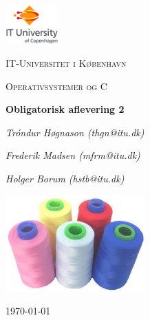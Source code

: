
\begin{titlepage}
	\centering
	\includegraphics[width=0.15\textwidth]{logo}\par\vspace{1cm}
	{\scshape\LARGE IT-Universitet i København \par}
	\vspace{1cm}
	{\scshape\Large Operativsystemer og C\par}
	\vspace{1.5cm}
	{\huge\bfseries Obligatorisk aflevering 2\par}
	\vspace{2cm}
	{\Large\itshape Tróndur Høgnason (thgn@itu.dk)\par}
	{\Large\itshape Frederik Madsen (mfrm@itu.dk)\par}
	{\Large\itshape Holger Borum (hstb@itu.dk)\par}
	\vspace{1 cm}
	\includegraphics[width=0.4\textwidth]{thread}\par\vspace{1cm}
\vspace{\fill}
	{\large \today\par}
\end{titlepage}